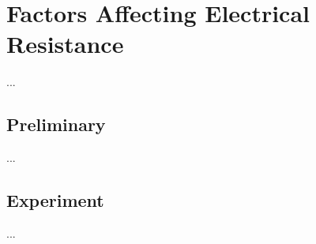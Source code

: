 \setcounter{chapter}{1}
\chapter{Factors Affecting Electrical Resistance}
...
\section{Preliminary}
...
\section{Experiment}
...
